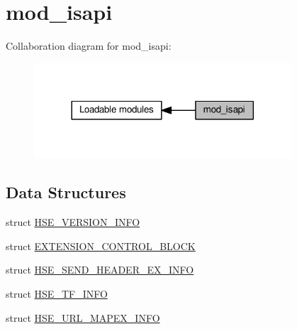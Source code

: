 \hypertarget{group__MOD__ISAPI}{}\section{mod\+\_\+isapi}
\label{group__MOD__ISAPI}
Collaboration diagram for mod\+\_\+isapi\+:
\nopagebreak
\begin{figure}[H]
\begin{center}
\leavevmode
\includegraphics[width=272pt]{group__MOD__ISAPI}
\end{center}
\end{figure}
\subsection*{Data Structures}
\begin{DoxyCompactItemize}
\item 
struct \hyperlink{structHSE__VERSION__INFO}{H\+S\+E\+\_\+\+V\+E\+R\+S\+I\+O\+N\+\_\+\+I\+N\+FO}
\item 
struct \hyperlink{structEXTENSION__CONTROL__BLOCK}{E\+X\+T\+E\+N\+S\+I\+O\+N\+\_\+\+C\+O\+N\+T\+R\+O\+L\+\_\+\+B\+L\+O\+CK}
\item 
struct \hyperlink{structHSE__SEND__HEADER__EX__INFO}{H\+S\+E\+\_\+\+S\+E\+N\+D\+\_\+\+H\+E\+A\+D\+E\+R\+\_\+\+E\+X\+\_\+\+I\+N\+FO}
\item 
struct \hyperlink{structHSE__TF__INFO}{H\+S\+E\+\_\+\+T\+F\+\_\+\+I\+N\+FO}
\item 
struct \hyperlink{structHSE__URL__MAPEX__INFO}{H\+S\+E\+\_\+\+U\+R\+L\+\_\+\+M\+A\+P\+E\+X\+\_\+\+I\+N\+FO}
\end{DoxyCompactItemize}
